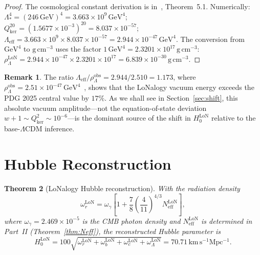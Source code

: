 \documentclass[12pt]{article}
\theoremstyle{plain}
\newtheorem{theorem}{Theorem}[section]
\theoremstyle{definition}
\newtheorem{remark}[theorem]{Remark}
\numberwithin{equation}{section}
\newcommand{\kker}{\mathrm{ker}}
\newcommand{\eff}{\mathrm{eff}}
\newcommand{\obs}{\mathrm{obs}}
\newcommand{\LoN}{\mathrm{LoN}}
\begin{document}
\begin{proof}
The cosmological constant derivation is in~\cite{ParticleCosmo}, Theorem~5.1.
Numerically: $\Lambda_*^4=(246\,\mathrm{GeV})^4=3.663\times10^9\,\mathrm{GeV}^4$;
$Q_{\kker}^{20}=(1.5677\times10^{-3})^{20}=8.037\times10^{-57}$;
$\Lambda_{\eff}=3.663\times10^9\times8.037\times10^{-57}=2.944\times10^{-47}\,\mathrm{GeV}^4$.
The conversion from $\mathrm{GeV}^4$ to $\mathrm{g\,cm^{-3}}$ uses the
factor $1\,\mathrm{GeV}^4=2.3201\times10^{17}\,\mathrm{g\,cm^{-3}}$:
$\rho_\Lambda^{\LoN}=2.944\times10^{-47}\times2.3201\times10^{17}=6.839\times10^{-30}\,\mathrm{g\,cm^{-3}}$.
\end{proof}

\begin{remark}
The ratio $\Lambda_{\eff}/\rho_\Lambda^{\obs}=2.944/2.510=1.173$, where
$\rho_\Lambda^{\obs}=2.51\times10^{-47}\,\mathrm{GeV}^4$~\cite{PDG2025},
shows that the LoNalogy vacuum energy exceeds the PDG 2025 central value
by $17\%$.  As we shall see in Section~\ref{sec:shift}, this absolute vacuum
amplitude---not the equation-of-state deviation $w+1\sim Q_{\kker}^2\sim10^{-6}$---is
the dominant source of the shift in $H_0^{\LoN}$ relative to the
base-$\Lambda$CDM inference.
\end{remark}


\section{Hubble Reconstruction}\label{sec:H0recon}

\begin{theorem}[LoNalogy Hubble reconstruction]\label{thm:H0}
With the radiation density
\begin{equation}
\omega_r^{\LoN} = \omega_\gamma\left[1+\frac{7}{8}\left(\frac{4}{11}\right)^{4/3}N_{\eff}^{\LoN}\right],
\end{equation}
where $\omega_\gamma=2.469\times10^{-5}$ is the CMB photon density
and $N_{\eff}^{\LoN}$ is determined in Part~II (Theorem~\ref{thm:Neff}),
the reconstructed Hubble parameter is
\begin{equation}
\boxed{H_0^{\LoN} = 100\sqrt{\omega_r^{\LoN}+\omega_b^{\LoN}+\omega_c^{\LoN}+\omega_\Lambda^{\LoN}}
= 70.71\,\mathrm{km\,s^{-1}Mpc^{-1}}.}
\end{equation}
\end{theorem}
\end{document}
